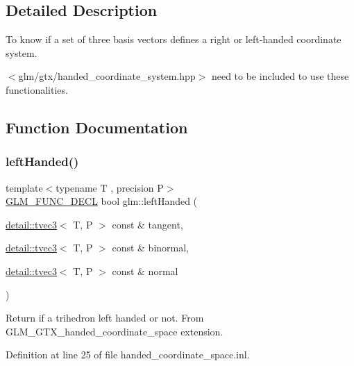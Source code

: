 \subsection{Detailed Description}
To know if a set of three basis vectors defines a right or left-\/handed coordinate system. 

$<$glm/gtx/handed\+\_\+coordinate\+\_\+system.\+hpp$>$ need to be included to use these functionalities. 

\subsection{Function Documentation}
\mbox{\label{group__gtx__handed__coordinate__space_ga2c0882af0eabd0e39da5680931f586ed}} 
\subsubsection{\texorpdfstring{left\+Handed()}{leftHanded()}}
{\footnotesize\ttfamily template$<$typename T , precision P$>$ \\
\hyperlink{setup_8hpp_ab2d052de21a70539923e9bcbf6e83a51}{G\+L\+M\+\_\+\+F\+U\+N\+C\+\_\+\+D\+E\+CL} bool glm\+::left\+Handed (\begin{DoxyParamCaption}\item[{\hyperlink{structglm_1_1detail_1_1tvec3}{detail\+::tvec3}$<$ T, P $>$ const \&}]{tangent,  }\item[{\hyperlink{structglm_1_1detail_1_1tvec3}{detail\+::tvec3}$<$ T, P $>$ const \&}]{binormal,  }\item[{\hyperlink{structglm_1_1detail_1_1tvec3}{detail\+::tvec3}$<$ T, P $>$ const \&}]{normal }\end{DoxyParamCaption})}

Return if a trihedron left handed or not. From G\+L\+M\+\_\+\+G\+T\+X\+\_\+handed\+\_\+coordinate\+\_\+space extension. 

Definition at line 25 of file handed\+\_\+coordinate\+\_\+space.\+inl.

\mbox{\label{group__gtx__handed__coordinate__space_ga16517e8a56cba5ba908e6eac6500ab94}} 
